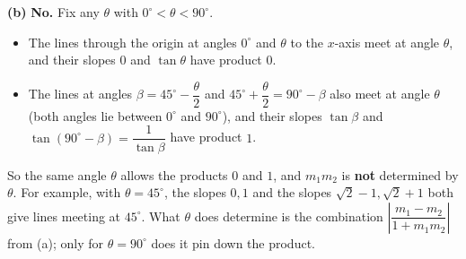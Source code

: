 \textbf{(b)} \textbf{No.} Fix any $\theta$ with $0^\circ<\theta<90^\circ$.
\begin{itemize}
\item The lines through the origin at angles $0^\circ$ and $\theta$ to the $x$-axis meet at angle $\theta$, and their slopes $0$ and $\tan\theta$ have product $0$.
\item The lines at angles $\beta=45^\circ-\dfrac{\theta}{2}$ and $45^\circ+\dfrac{\theta}{2}=90^\circ-\beta$ also meet at angle $\theta$ (both angles lie between $0^\circ$ and $90^\circ$), and their slopes $\tan\beta$ and $\tan\left(90^\circ-\beta\right)=\dfrac{1}{\tan\beta}$ have product $1$.
\end{itemize}
So the same angle $\theta$ allows the products $0$ and $1$, and $m_1m_2$ is \textbf{not} determined by $\theta$. For example, with $\theta=45^\circ$, the slopes $0,1$ and the slopes $\sqrt2-1,\sqrt2+1$ both give lines meeting at $45^\circ$. What $\theta$ does determine is the combination $\left|\dfrac{m_1-m_2}{1+m_1m_2}\right|$ from (a); only for $\theta=90^\circ$ does it pin down the product.
